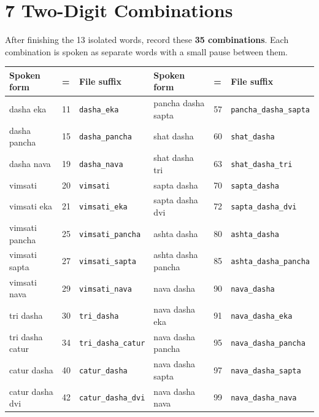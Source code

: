 \documentclass[11pt,a4paper]{article}
\begin{document}
\section*{7 \quad Two-Digit Combinations}

After finishing the 13 isolated words, record these \textbf{35 combinations}.
Each combination is spoken as separate words with a small pause between them.

\vspace{0.3cm}
\begin{center}
\renewcommand{\arraystretch}{1.2}
\small
\begin{tabular}{lll|lll}
\toprule
\textbf{Spoken form} & \textbf{=} & \textbf{File suffix} &
\textbf{Spoken form} & \textbf{=} & \textbf{File suffix} \\
\midrule
dasha eka              & 11 & \texttt{dasha\_eka}       & pancha dasha sapta & 57 & \texttt{pancha\_dasha\_sapta} \\
dasha pancha           & 15 & \texttt{dasha\_pancha}    & shat dasha         & 60 & \texttt{shat\_dasha} \\
dasha nava             & 19 & \texttt{dasha\_nava}      & shat dasha tri     & 63 & \texttt{shat\_dasha\_tri} \\
vimsati                & 20 & \texttt{vimsati}          & sapta dasha        & 70 & \texttt{sapta\_dasha} \\
vimsati eka            & 21 & \texttt{vimsati\_eka}     & sapta dasha dvi    & 72 & \texttt{sapta\_dasha\_dvi} \\
vimsati pancha         & 25 & \texttt{vimsati\_pancha}  & ashta dasha        & 80 & \texttt{ashta\_dasha} \\
vimsati sapta          & 27 & \texttt{vimsati\_sapta}   & ashta dasha pancha & 85 & \texttt{ashta\_dasha\_pancha} \\
vimsati nava           & 29 & \texttt{vimsati\_nava}    & nava dasha         & 90 & \texttt{nava\_dasha} \\
tri dasha              & 30 & \texttt{tri\_dasha}       & nava dasha eka     & 91 & \texttt{nava\_dasha\_eka} \\
tri dasha catur        & 34 & \texttt{tri\_dasha\_catur}& nava dasha pancha  & 95 & \texttt{nava\_dasha\_pancha} \\
catur dasha            & 40 & \texttt{catur\_dasha}     & nava dasha sapta   & 97 & \texttt{nava\_dasha\_sapta} \\
catur dasha dvi        & 42 & \texttt{catur\_dasha\_dvi}& nava dasha nava    & 99 & \texttt{nava\_dasha\_nava} \\

\end{tabular}
\end{center}
\end{document}
